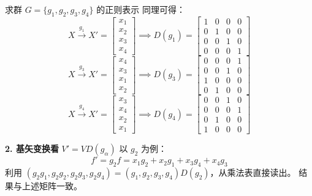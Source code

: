 \begin{example}{求群 $G=\{g_1, g_2, g_3, g_4\}$ 的正则表示}
    同理可得：
    \begin{equation}
        X \xrightarrow{g_1} X' = \begin{bmatrix} x_1 \\ x_2 \\ x_3 \\ x_4 \end{bmatrix} \implies D(g_1) = \begin{bmatrix} 1 & 0 & 0 & 0 \\ 0 & 1 & 0 & 0 \\ 0 & 0 & 1 & 0 \\ 0 & 0 & 0 & 1 \end{bmatrix}
    \end{equation}
    \begin{equation}
        X \xrightarrow{g_3} X' = \begin{bmatrix} x_4 \\ x_3 \\ x_1 \\ x_2 \end{bmatrix} \implies D(g_3) = \begin{bmatrix} 0 & 0 & 0 & 1 \\ 0 & 0 & 1 & 0 \\ 1 & 0 & 0 & 0 \\ 0 & 1 & 0 & 0 \end{bmatrix}
    \end{equation}
    \begin{equation}
        X \xrightarrow{g_4} X' = \begin{bmatrix} x_3 \\ x_4 \\ x_2 \\ x_1 \end{bmatrix} \implies D(g_4) = \begin{bmatrix} 0 & 0 & 1 & 0 \\ 0 & 0 & 0 & 1 \\ 0 & 1 & 0 & 0 \\ 1 & 0 & 0 & 0 \end{bmatrix}
    \end{equation}

    \textbf{2. 基矢变换看} $V' = V D(g_\alpha)$
    以 $g_2$ 为例：
    \begin{equation}
        f' = g_2 f = x_1 g_2 + x_2 g_1 + x_3 g_4 + x_4 g_3
    \end{equation}
    利用 $(g_2 g_1, g_2 g_2, g_2 g_3, g_2 g_4) = (g_1, g_2, g_3, g_4) D(g_2)$，从乘法表直接读出。
    结果与上述矩阵一致。


\end{example}
